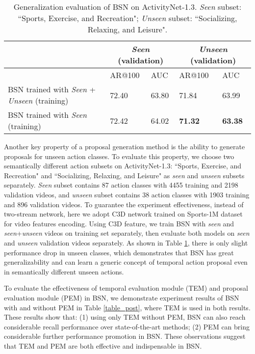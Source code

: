 \documentclass[runningheads]{llncs}
\begin{document}
\begin{table}[tbp]
\centering
\caption{  Generalization evaluation of BSN on ActivityNet-1.3. \emph{Seen} subset: ``Sports, Exercise, and Recreation";  \emph{Unseen} subset: ``Socializing, Relaxing, and Leisure".  }
\begin{tabular}{m{5.5cm}m{1.5cm}<{\centering}m{1.5cm}<{\centering}m{1.5cm}<{\centering}m{1.5cm}<{\centering}}
\toprule
 & \multicolumn{2}{c}{\emph{Seen} (validation)} & \multicolumn{2}{c}{\emph{Unseen} (validation)}  \\
\hline   &  AR@100  & AUC & AR@100 & AUC \\
\hline
BSN trained with \emph{Seen} + \emph{Unseen} (training)  	&  72.40  & 63.80 & 71.84 & 63.99 \\
BSN trained with \emph{Seen} (training)   			&  72.42  & 64.02 & {\bf 71.32}   & {\bf 63.38} \\
\bottomrule
\end{tabular}
\label{table_gene}
\vspace{-0.6cm}
\end{table}


 Another key property of a proposal generation method  is the ability to generate proposals for unseen action classes.
To evaluate this property, we choose two  semantically different action subsets on ActivityNet-1.3: ``Sports, Exercise, and Recreation" and ``Socializing, Relaxing, and Leisure" as \emph{seen} and \emph{unseen} subsets separately. \emph{Seen} subset contains 87 action classes with 4455  training and 2198 validation videos, and \emph{unseen} subset contains 38 action classes with 1903  training and 896 validation videos.
To guarantee the experiment effectiveness, instead of two-stream network, here we adopt C3D network \cite{tran2017convnet} trained on Sports-1M dataset \cite{sports1m} for video features encoding. Using C3D feature, we train BSN with \emph{seen} and \emph{seen}+\emph{unseen} videos on training set separately, then evaluate both models on \emph{seen} and \emph{unseen} validation videos separately.
As shown in Table \ref{table_gene},  there is only slight performance drop in unseen classes, which demonstrates that BSN  has great generalizability and can learn a generic concept of temporal action proposal even in semantically different unseen actions.

To evaluate the effectiveness of  temporal evaluation module (TEM) and proposal evaluation module (PEM) in BSN, we demonstrate experiment results of BSN with and without PEM in Table \ref{table_post}, where TEM is used in both results. These results show that: (1) using only TEM without PEM, BSN can also reach considerable recall performance over  state-of-the-art methods; (2) PEM can bring considerable further  performance promotion in BSN. These observations suggest that TEM and PEM are both effective and indispensable in BSN.
\end{document}
